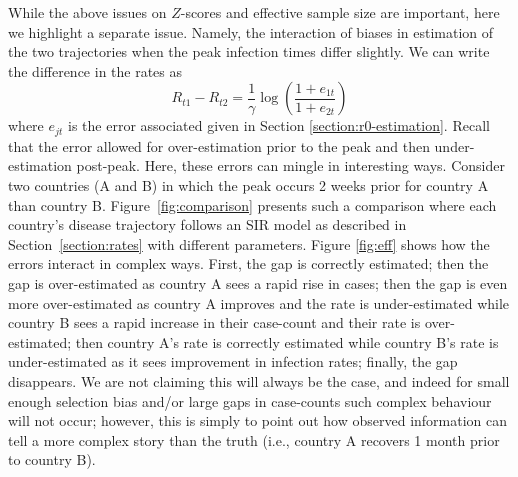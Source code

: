 \documentclass[aoas]{amsart}
\begin{document}
While the above issues on $Z$-scores and effective sample size are important, here we highlight a separate issue.  Namely, the interaction of biases in estimation of the two trajectories when the peak infection times differ slightly.  We can write the difference in the rates as
$$
R_{t1} - R_{t2} = \frac{1}{\gamma} \log \left( \frac{1 + e_{1t}}{1+e_{2t}} \right)
$$
where $e_{jt}$ is the error associated given in Section \ref{section:r0-estimation}.  Recall that the error allowed for over-estimation prior to the peak and then under-estimation post-peak.  Here, these errors can mingle in interesting ways.  Consider two countries (A and B) in which the peak occurs 2 weeks prior for country A than country B.  Figure~\ref{fig:comparison} presents such a comparison where each country's disease trajectory follows an SIR model as described in Section~\ref{section:rates} with different parameters.  Figure \ref{fig:eff} shows how the errors interact in complex ways.  First, the gap is correctly estimated; then the gap is over-estimated as country A sees a rapid rise in cases; then the gap is even more over-estimated as country A improves and the rate is under-estimated while country B sees a rapid increase in their case-count and their rate is over-estimated; then country A's rate is correctly estimated while country B's rate is under-estimated as it sees improvement in infection rates; finally, the gap disappears.  We are not claiming this will always be the case, and indeed for small enough selection bias and/or large gaps in case-counts such complex behaviour will not occur; however, this is simply to point out how observed information can tell a more complex story than the truth (i.e., country A recovers 1 month prior to country B).
\end{document}
